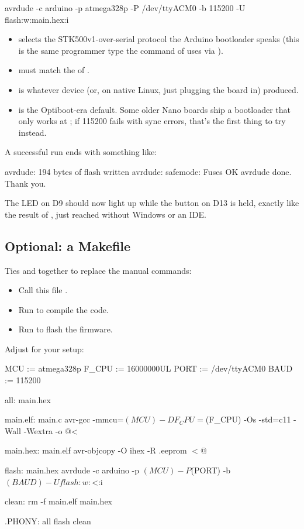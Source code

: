 \begin{shell}
avrdude -c arduino -p atmega328p -P /dev/ttyACM0 -b 115200 -U flash:w:main.hex:i
\end{shell}

\begin{itemize}
  \item {} selects the STK500v1-over-serial protocol the Arduino bootloader speaks
    (this is the same programmer type the  command of  uses via
    ).
  \item {} must match the  of .
  \item {} is whatever device  (or, on native Linux, just plugging the board
    in) produced.
  \item {} is the Optiboot-era default. Some older Nano boards ship a bootloader that
    only works at ; if 115200 fails with sync errors, that's the first thing to try
    instead.
\end{itemize}
A successful run ends with something like:

\begin{console}
avrdude: 194 bytes of flash written
avrdude: safemode: Fuses OK
avrdude done. Thank you.
\end{console}

\noindent The LED on D9 should now light up while the button on D13 is held, exactly like the
result of , just reached without Windows or an IDE.

\subsection{Optional: a Makefile}
\label{c2:d:8}
Ties  and  together to replace the manual commands:
\begin{itemize}
  \item Call this file .
  \item Run  to compile the code.
  \item Run  to flash the firmware.
\end{itemize}
Adjust  for your setup:

\begin{makecode}
MCU   := atmega328p
F_CPU := 16000000UL
PORT  := /dev/ttyACM0
BAUD  := 115200

all: main.hex

main.elf: main.c
	avr-gcc -mmcu=$(MCU) -DF_CPU=$(F_CPU) -Os -std=c11 -Wall -Wextra -o $@ $<

main.hex: main.elf
	avr-objcopy -O ihex -R .eeprom $< $@

flash: main.hex
	avrdude -c arduino -p $(MCU) -P $(PORT) -b $(BAUD) -U flash:w:$<:i

clean:
	rm -f main.elf main.hex

.PHONY: all flash clean
\end{makecode}
